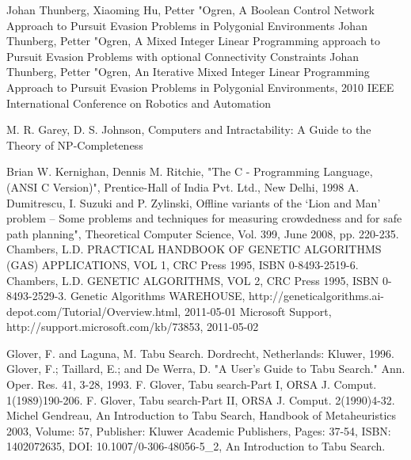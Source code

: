 \begin{thebibliography}{99}
  Johan Thunberg, Xiaoming Hu, Petter "Ogren, A Boolean Control Network Approach to Pursuit Evasion Problems in Polygonial Environments
 Johan Thunberg, Petter "Ogren, A Mixed Integer Linear Programming approach to Pursuit Evasion Problems with optional Connectivity Constraints
 Johan Thunberg, Petter "Ogren, An Iterative Mixed Integer Linear Programming Approach to Pursuit Evasion Problems in Polygonial Environments, 2010 IEEE International Conference on Robotics and Automation

 M. R. Garey, D. S. Johnson, Computers and Intractability: A Guide to the Theory of NP-Completeness

 Brian W. Kernighan, Dennis M. Ritchie, "The C - Programming Language, (ANSI C Version)", Prentice-Hall of India Pvt. Ltd., New Delhi, 1998
 A. Dumitrescu, I. Suzuki and P. Zylinski, Offline variants of the `Lion and Man' problem -- Some problems and techniques for measuring crowdedness and for safe path planning", Theoretical Computer Science, Vol. 399, June 2008, pp. 220-235.
 Chambers, L.D. PRACTICAL HANDBOOK OF GENETIC ALGORITHMS (GAS) APPLICATIONS, VOL 1, CRC Press 1995, ISBN 0-8493-2519-6.
 Chambers, L.D. GENETIC ALGORITHMS, VOL 2, CRC Press 1995, ISBN 0-8493-2529-3.
 Genetic Algorithms WAREHOUSE, http://geneticalgorithms.ai-depot.com/Tutorial/Overview.html, 2011-05-01
 Microsoft Support, http://support.microsoft.com/kb/73853, 2011-05-02


  Glover, F. and Laguna, M. Tabu Search. Dordrecht, Netherlands: Kluwer, 1996.
  Glover, F.; Taillard, E.; and De Werra, D. "A User's Guide to Tabu Search." Ann. Oper. Res. 41, 3-28, 1993.
 F. Glover, Tabu search-Part I, ORSA J. Comput. 1(1989)190-206.
 F. Glover, Tabu search-Part II, ORSA J. Comput. 2(1990)4-32.
 Michel Gendreau, An Introduction to Tabu Search, Handbook of Metaheuristics 2003, Volume: 57, Publisher: Kluwer Academic Publishers, Pages: 37-54, ISBN: 1402072635, DOI: 10.1007/0-306-48056-5\_2, An Introduction to Tabu Search.


\end{thebibliography}
